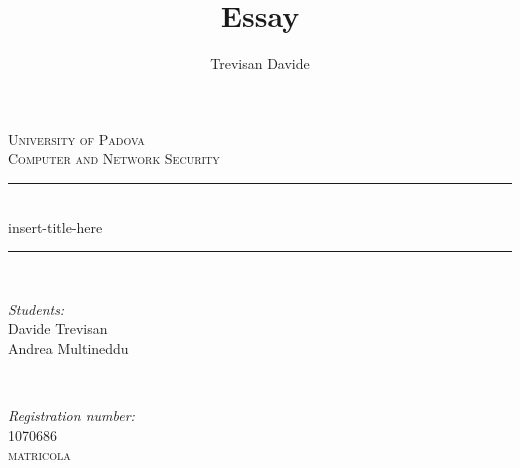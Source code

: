 \documentclass[12pt]{article}
\title{Essay}
\date{}
\author{Trevisan Davide}
\begin{document}
		
		
		
		\begin{titlepage}
			
			\newcommand{\HRule}{\rule{\linewidth}{0.5mm}} %
			
			\center %
			
			
			\textsc{\LARGE University of Padova}\\[1.5cm] %
			\textsc{\Large Computer and Network Security}\\[0.5cm] %
			
			
			\HRule \\[0.4cm]
			{ \huge insert-title-here}\\[0.3cm]
			\HRule \\[1.5cm]
			
			
			\begin{minipage}{0.4\textwidth}
				\begin{flushleft} \large
					\emph{Students:}\\
					Davide Trevisan\\ %
					Andrea Multineddu\\
				\end{flushleft}
			\end{minipage}
			~
			\begin{minipage}{0.4\textwidth}
				\begin{flushright}\large
					\emph{Registration number:} \\
					\textsc{1070686}\\ %
					\textsc{matricola}\\
				\end{flushright}
			\end{minipage}\\[1cm]
			

\end{titlepage}
\end{document}
